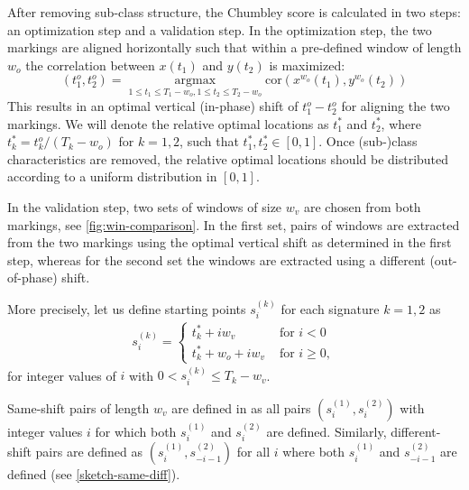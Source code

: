 \documentclass[12pt]{article}
\begin{document}
After removing sub-class structure, the Chumbley score is calculated in
two steps: an optimization step and a validation step. In the
optimization step, the two markings are aligned horizontally such that
within a pre-defined window of length \(w_o\) the correlation between
\(x(t_1)\) and \(y(t_2)\) is maximized: \[
\left(t_1^o, t_2^o\right) = \mathop{\arg \max}\limits_{1 \le t_1 \le T_1-w_o, 1 \le t_2 \le T_2-w_o} \text{cor} \left(x^{w_o} (t_1), y^{w_o}(t_2) \right)
\] This results in an optimal vertical (in-phase) shift of
\(t_1^o - t_2^o\) for aligning the two markings. We will denote the
relative optimal locations as \(t_1^*\) and \(t_2^*\), where
\(t_k^* = t_k^o/(T_k-w_o)\) for \(k=1,2\), such that
\(t_1^*, t_2^* \in [0,1]\). Once (sub-)class characteristics are
removed, the relative optimal locations should be distributed according
to a uniform distribution in \([0,1]\).

In the validation step, two sets of windows of size \(w_v\) are chosen
from both markings, see \autoref{fig:win-comparison}. In the first set,
pairs of windows are extracted from the two markings using the optimal
vertical shift as determined in the first step, whereas for the second
set the windows are extracted using a different (out-of-phase) shift.

More precisely, let us define starting points \(s_i^{(k)}\) for each
signature \(k = 1, 2\) as \begin{eqnarray}\label{eq.start}
s^{(k)}_i = 
\begin{cases}
t_k^* + i w_v & \text{ for } i < 0 \\
t_k^* + w_ o + i w_v & \text{ for } i \ge 0,
\end{cases}
\end{eqnarray} for integer values of \(i\) with
\(0 < s^{(k)}_i \le T_k - w_v\).

Same-shift pairs of length \(w_v\) are defined in \citet{hadler} as all
pairs \((s_i^{(1)}, s_i^{(2)})\) with integer values \(i\) for which
both \(s_i^{(1)}\) and \(s_i^{(2)}\) are defined. Similarly,
different-shift pairs are defined as \((s_i^{(1)}, s_{-i-1}^{(2)})\) for
all \(i\) where both \(s_i^{(1)}\) and \(s_{-i-1}^{(2)}\) are defined
(see \autoref{sketch-same-diff}).
\end{document}
